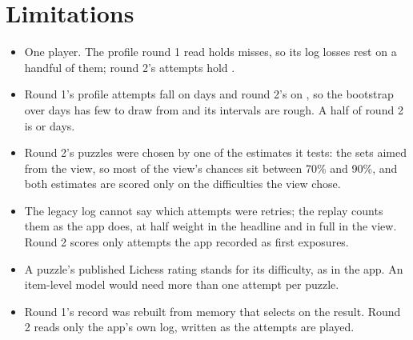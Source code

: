 \documentclass[11pt]{article}
\begin{document}
\begin{table}[!htbp]
\centering\footnotesize\setlength{\tabcolsep}{4pt}
\TwoTodayTable
\caption{Each puzzle bucket as the profile round 2 read stood when it was synced, on \TwoSynced{}
(Los Angeles time), in the columns of Table~\ref{tab:today}. The app aims from the view in every
bucket that has one.}
\label{tab:today2}
\end{table}

\section{Limitations}

\begin{itemize}[nosep]
\item One player. The profile round 1 read holds \PMisses{} misses, so its log losses rest on a
handful of them; round 2's attempts hold \TwoMisses.
\item Round 1's profile attempts fall on \PDays{} days and round 2's on \TwoDays, so the bootstrap
over days has few to draw from and its intervals are rough. A half of round 2 is \TwoHOneDays{} or
\TwoHTwoDays{} days.
\item Round 2's puzzles were chosen by one of the estimates it tests: the sets aimed from the
view, so most of the view's chances sit between 70\% and 90\%, and both estimates are scored only
on the difficulties the view chose.
\item The legacy log cannot say which attempts were retries; the replay counts them as the app does,
at half weight in the headline and in full in the view. Round 2 scores only attempts the app
recorded as first exposures.
\item A puzzle's published Lichess rating stands for its difficulty, as in the app. An item-level
model would need more than one attempt per puzzle.
\item Round 1's record was rebuilt from memory that selects on the result. Round 2 reads only the
app's own log, written as the attempts are played.
\end{itemize}
\end{document}
